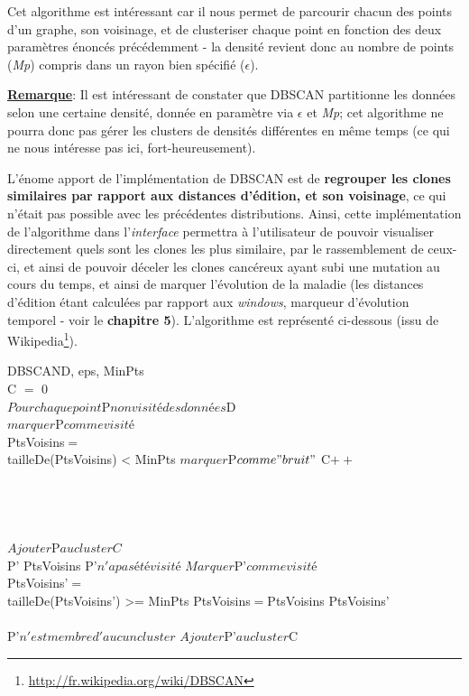 \documentclass[pdftex,12pt,a4paper]{report}
\begin{document}
\begin{spacing}{1.2}
Cet algorithme est intéressant car il nous permet de parcourir chacun des points d'un graphe, son voisinage, et de clusteriser chaque point en fonction des deux paramètres énoncés précédemment - la densité revient donc au nombre de points (\textit{Mp}) compris dans un rayon bien spécifié ($\epsilon$).

\textbf{\underline{Remarque}}: Il est intéressant de constater que DBSCAN partitionne les données selon une certaine densité, donnée en paramètre via $\epsilon$ et \textit{Mp}; cet algorithme ne pourra donc pas gérer les clusters de densités différentes en même temps (ce qui ne nous intéresse pas ici, fort-heureusement).

L'énome apport de l'implémentation de DBSCAN est de \textbf{regrouper les clones similaires par rapport aux distances d'édition, et son voisinage}, ce qui n'était pas possible avec les précédentes distributions.
Ainsi, cette implémentation de l'algorithme dans l'\textit{interface} permettra à l'utilisateur de pouvoir visualiser directement quels sont les clones les plus similaire, par le rassemblement de ceux-ci, et ainsi de pouvoir déceler les clones cancéreux ayant subi une mutation au cours du temps, et ainsi de marquer l'évolution de la maladie (les distances d'édition étant calculées par rapport aux \textit{windows}, marqueur d'évolution temporel - voir le \textbf{chapitre 5}).
\newline
L'algorithme est représenté ci-dessous (issu de Wikipedia\footnote{\url{http://fr.wikipedia.org/wiki/DBSCAN}}).

\begin{pseudocode}{DBSCAN}{D, eps, MinPts}
\\
C $=$ 0\\
$Pour chaque point $P$ non visité des données $D\\
$marquer $P$ comme visité$\\
PtsVoisins$ = $\\
\IF tailleDe(PtsVoisins) < MinPts
\THEN $marquer $P$ comme "bruit"$
\ELSE 
	\BEGIN
		C$++$\\
		\\
	\END\\
\\

\\
	$Ajouter $P$ au cluster C$\\
	\FOREACH P' \in PtsVoisins \DO
			\IF P'$ n'a pas été visité$
			\THEN 
				\BEGIN
					$Marquer $P'$ comme visité$\\
					PtsVoisins'$ = $ \\
					\IF tailleDe(PtsVoisins') >= MinPts
					\THEN PtsVoisins$ = $PtsVoisins \cup PtsVoisins'\\
				\END\\
			\IF P'$ n'est membre d'aucun cluster$
			\THEN $Ajouter $P'$ au cluster $C
\ENDPROCEDURE


\end{pseudocode}
\end{spacing}
\end{document}

